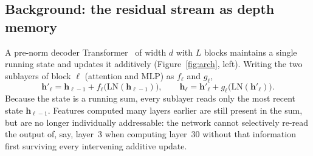 \documentclass{article}
\begin{document}
\subsection{Background: the residual stream as depth memory}
A pre-norm decoder Transformer~\citep{vaswani2017attention,xiong2020prenorm} of
width $d$ with $L$ blocks maintains a single running state and updates it additively
(Figure~\ref{fig:arch}, left). Writing the two
sublayers of block $\ell$ (attention and MLP) as $f_\ell$ and $g_\ell$,
\begin{equation}
\mathbf{h}'_\ell = \mathbf{h}_{\ell-1} + f_\ell\big(\mathrm{LN}(\mathbf{h}_{\ell-1})\big),
\qquad
\mathbf{h}_\ell = \mathbf{h}'_\ell + g_\ell\big(\mathrm{LN}(\mathbf{h}'_\ell)\big).
\label{eq:resid}
\end{equation}
Because the state is a running sum, every sublayer reads only the most recent
state $\mathbf{h}_{\ell-1}$. Features computed many layers earlier are still
present in the sum, but are no longer individually addressable: the network
cannot selectively re-read the output of, say, layer~3 when computing layer~30
without that information first surviving every intervening additive update.
\end{document}
